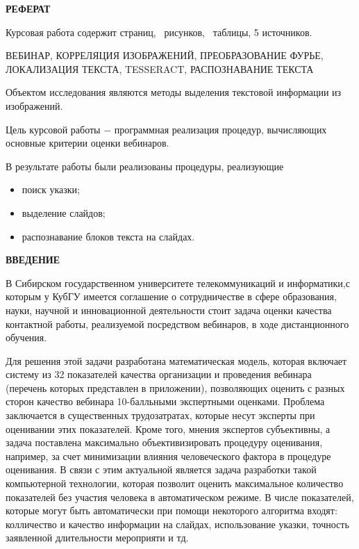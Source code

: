 \documentclass[oneside,final,14pt]{extreport}
\providecommand\totfig{}
\providecommand\tottab{}
\begin{document}
\begin{center}
\bfseries РЕФЕРАТ
\end{center}

Курсовая работа содержит \pageref{LastPage} страниц, \totfig\ рисунков, \tottab\ таблицы, 5 источников.

ВЕБИНАР, КОРРЕЛЯЦИЯ ИЗОБРАЖЕНИЙ, ПРЕОБРАЗОВАНИЕ ФУРЬЕ, ЛОКАЛИЗАЦИЯ ТЕКСТА, TESSERACT, РАСПОЗНАВАНИЕ ТЕКСТА

Объектом исследования являются методы выделения текстовой информации из изображений.

Цель курсовой работы $-$ программная реализация процедур, вычисляющих основные критерии оценки вебинаров.

В результате работы были реализованы процедуры, реализующие
\begin{itemize}
\item поиск указки;
\item выделение слайдов;
\item распознавание блоков текста на слайдах.
\end{itemize} 

\tableofcontents
\newpage
\begin{center}
\bfseries ВВЕДЕНИЕ
\end{center}

В Сибирском государственном университете телекоммуникаций и информатики,с которым у КубГУ имеется соглашение о сотрудничестве в сфере образования, науки, научной и инновационной деятельности стоит задача оценки
качества контактной работы, реализуемой посредством вебинаров, в ходе дистанционного обучения. 

Для решения этой задачи разработана математическая модель, которая включает систему из 32 показателей качества организации и проведения вебинара (перечень которых представлен в приложении), позволяющих оценить с разных сторон  качество вебинара 10-балльными экспертными оценками. Проблема заключается в существенных трудозатратах, которые несут эксперты при оценивании этих показателей. Кроме того, мнения экспертов субъективны, а задача поставлена максимально объективизировать процедуру оценивания, например, за счет минимизации влияния человеческого фактора в процедуре оценивания. В связи с этим актуальной является  задача разработки такой компьютерной технологии, которая позволит оценить максимальное количество показателей без участия человека в автоматическом режиме. В числе показателей, которые могут быть автоматически при помощи некоторого алгоритма входят: колличество и качество информации на слайдах, использование указки, точность заявленной длительности мероприяти и тд.
\end{document}

